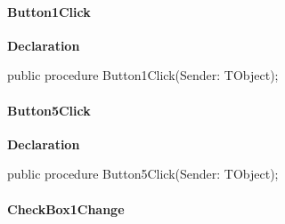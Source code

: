 \documentclass{report}
\newif\ifpdf
\begin{document}
\paragraph*{Button1Click}\hspace*{\fill}

\label{igobase.TIWizFrm-Button1Click}
\begin{list}{}{
\setlength{\itemindent}{0cm}
\setlength{\listparindent}{0cm}
\setlength{\leftmargin}{\evensidemargin}
\addtolength{\leftmargin}{\tmplength}
\settowidth{\labelsep}{X}
\addtolength{\leftmargin}{\labelsep}
\setlength{\labelwidth}{\tmplength}
}
\item[\textbf{Declaration}\hfill]
\ifpdf
\begin{flushleft}
\fi
\begin{ttfamily}
public procedure Button1Click(Sender: TObject);\end{ttfamily}

\ifpdf
\end{flushleft}
\fi

\end{list}
\paragraph*{Button5Click}\hspace*{\fill}

\label{igobase.TIWizFrm-Button5Click}
\begin{list}{}{
\setlength{\itemindent}{0cm}
\setlength{\listparindent}{0cm}
\setlength{\leftmargin}{\evensidemargin}
\addtolength{\leftmargin}{\tmplength}
\settowidth{\labelsep}{X}
\addtolength{\leftmargin}{\labelsep}
\setlength{\labelwidth}{\tmplength}
}
\item[\textbf{Declaration}\hfill]
\ifpdf
\begin{flushleft}
\fi
\begin{ttfamily}
public procedure Button5Click(Sender: TObject);\end{ttfamily}

\ifpdf
\end{flushleft}
\fi

\end{list}
\paragraph*{CheckBox1Change}\hspace*{\fill}
\end{document}
